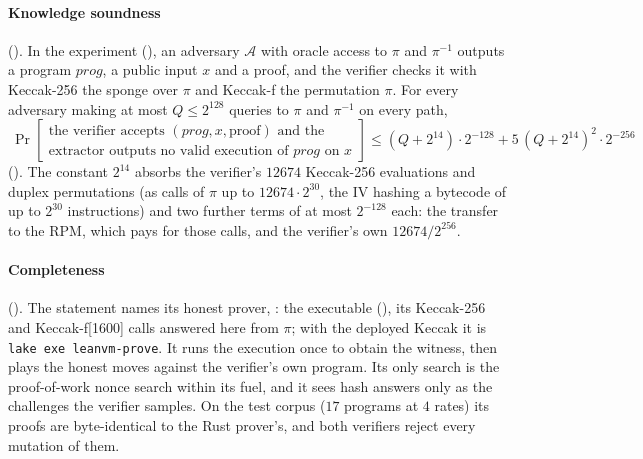 \documentclass[11pt]{article}
\begin{document}
\paragraph{Knowledge soundness} (). In the experiment
(), an adversary $\mathcal{A}$ with oracle access to $\pi$ and
$\pi^{-1}$ outputs a program $\mathit{prog}$, a public input $x$ and a proof, and the verifier
checks it with Keccak-256 the sponge over $\pi$ and Keccak-f the permutation $\pi$. For every
adversary making at most $Q \le 2^{128}$ queries to $\pi$ and $\pi^{-1}$ on every path,
\[
\boxed{\ \Pr\left[\begin{array}{l}\text{the verifier accepts } (\mathit{prog},x,\text{proof}) \text{ and the}\\
\text{extractor outputs no valid execution of } \mathit{prog} \text{ on } x\end{array}\right]
\le (Q+2^{14})\cdot 2^{-128} + 5\,(Q+2^{14})^2\cdot 2^{-256}\ }
\]
(). The constant $2^{14}$ absorbs the verifier's $12674$
Keccak-256 evaluations and duplex permutations (as calls of $\pi$ up to $12674\cdot 2^{30}$, the IV
hashing a bytecode of up to $2^{30}$ instructions) and two further terms of at most $2^{-128}$ each:
the transfer to the RPM, which pays for those calls, and the verifier's own $12674/2^{256}$.

\paragraph{Completeness} (). The statement names its honest prover,
: the executable 
(), its Keccak-256 and Keccak-f[1600] calls answered here from $\pi$; with
the deployed Keccak it is \texttt{lake exe leanvm-prove}. It runs the execution once to obtain the
witness, then plays the honest moves against the verifier's own program. Its only search is the
proof-of-work nonce search within its fuel, and it sees hash answers only as the challenges the
verifier samples. On the test corpus ($17$ programs at $4$ rates) its proofs are byte-identical to
the Rust prover's, and both verifiers reject every mutation of them.
\end{document}
